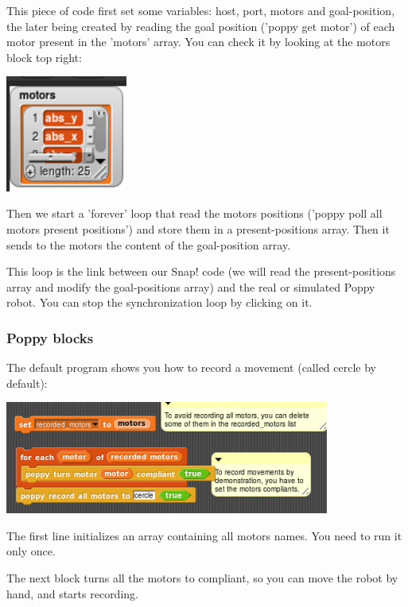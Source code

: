 \documentclass{article}
\begin{document}
This piece of code first set some variables: host, port, motors and goal-position, the later being created by reading the goal position  ('poppy get motor') of each motor present in the 'motors' array. You can check it by looking at the motors block top right:

 \begin{center}
  \includegraphics[width=0.3\textwidth]{img/snap_motors}
 \end{center}


Then we start a 'forever' loop that read the motors positions ('poppy poll all motors present positions') and store them in a present-positions array. Then it sends to the motors the content of the goal-position array.

This loop is the link between our Snap! code (we will read the present-positions array and modify the goal-positions array) and the real or simulated Poppy robot. You can stop the synchronization loop by clicking on it.

\subsubsection{Poppy blocks}

The default program shows you how to record a movement (called cercle by default):

 \begin{center}
  \includegraphics[width=0.8\textwidth]{img/snap_record}
 \end{center}
 
 The first line initializes an array containing all motors names. You need to run it only once.
 
 The next block turns all the motors to compliant, so you can move the robot by hand, and starts recording.
 
\end{document}

